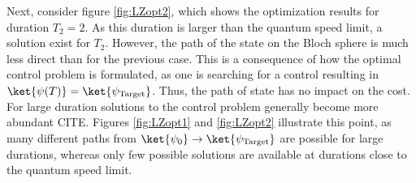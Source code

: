 Next, consider figure \ref{fig:LZopt2}, which shows the optimization results for duration $T_2 =  2$. As this duration is larger than the quantum speed limit, a solution exist for $T_2$. However, the path of the state on the Bloch sphere is much less direct than for the previous case. This is a consequence of how the optimal control problem is formulated, as one is searching for a control resulting in $\ket{\psi (T)} = \ket{\psi _{\mathrm{Target}}}$. Thus, the path of state has no impact on the cost.\\ For large duration solutions to the control problem generally become more abundant CITE. Figures \ref{fig:LZopt1} and \ref{fig:LZopt2} illustrate this point, as many different paths from $\ket{\psi _0} \to \ket{\psi _{\mathrm{Target}}}$ are possible for large durations, whereas only few possible solutions are available at durations close to the quantum speed limit.